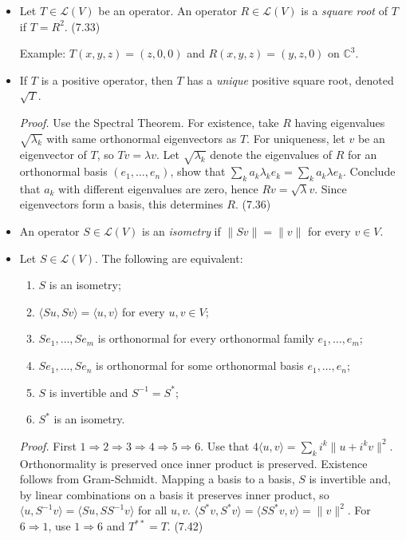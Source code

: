 \documentclass[11pt]{article}
\newcommand{\1}{\mathbf{1}}
\newcommand{\inner}[2]{\langle #1, #2 \rangle}
\newcommand{\0}{\mathbf{0}}
\newcommand{\C}{\mathbb{C}}
\newcommand{\spitem}{\item[$\circ$]}
\begin{document}
{\begin{itemize}
\item

Let $T\in\mathcal{L}(V)$ be an operator. An operator $R\in\mathcal{L}(V)$ is a \emph{square root} of $T$ if $T=R^2$.
\hfill
(7.33)

Example:
$T(x,y,z)=(z,0,0)$ and $R(x,y,z)=(y,z,0)$ on $\C^3$.

\item

If $T$ is a positive operator, then $T$ has a \emph{unique} positive square root, denoted $\sqrt{T}$.

\emph{Proof.}
Use the Spectral Theorem.
For existence, take $R$ having eigenvalues $\sqrt{\lambda_k}$ with same orthonormal eigenvectors as $T$.
For uniqueness, let $v$ be an eigenvector of $T$, so $Tv = \lambda v$.
Let $\sqrt{\lambda_k}$ denote the eigenvalues of $R$ for an orthonormal basis $(e_1,\dots,e_n)$, show that $\sum_k a_k \lambda_k e_k = \sum_k a_k \lambda e_k$.
Conclude that $a_k$ with different eigenvalues are zero, hence $Rv=\sqrt{\lambda}v$.
Since eigenvectors form a basis, this determines $R$.
\hfill
(7.36)

\item

An operator $S\in\mathcal{L}(V)$ is an \emph{isometry} if $\|Sv\|=\|v\|$ for every $v\in V$.

\spitem

Let $S\in\mathcal{L}(V)$.
The following are equivalent:
\begin{enumerate}
\item $S$ is an {isometry};
\item $\inner{Su}{Sv} = \inner{u}{v}$ for every $u,v\in V$;
\item $Se_1,\dots,Se_m$ is orthonormal for every orthonormal family $e_1,\dots,e_m$;
\item $Se_1,\dots,Se_n$ is orthonormal for some orthonormal basis $e_1,\dots,e_n$;
\item $S$ is invertible and $S^{-1}=S^*$;
\item $S^*$ is an isometry.
\end{enumerate}

\emph{Proof.}
First $1 \Rightarrow 2 \Rightarrow 3 \Rightarrow 4 \Rightarrow 5 \Rightarrow 6$.
Use that $4 \inner{u}{v} = \sum_k i^k \| u+i^k v\|^2$.
Orthonormality is preserved once inner product is preserved.
Existence follows from Gram-Schmidt.
Mapping a basis to a basis, $S$ is invertible and, by linear combinations on a basis it preserves inner product, so $\inner{u}{S^{-1}v}=\inner{Su}{SS^{-1}v}$ for all $u,v$.
$\inner{S^*v}{S^*v}=\inner{SS^*v}{v}=\|v\|^2$.
For $6 \Rightarrow 1$, use $1 \Rightarrow 6$ and $T^{**}=T$.
\hfill
(7.42)


\end{itemize}}
\end{document}
